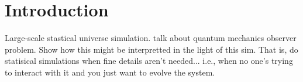 \documentclass[ ../main.tex]{subfiles}
\begin{document}
\section{Introduction}
Large-scale stastical universe simulation. talk about quantum mechanics observer problem. Show how this might be interpretted in the light of this sim. That is, do statisical simulations when fine details aren't needed... i.e., when no one's trying to interact with it and you just want to evolve the system.
\end{document}
